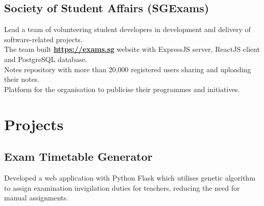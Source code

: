 \documentclass[a4paper,hidelinks]{resume} %
\begin{document}
\begin{minipage}[t]{0.50\textwidth}
    \sectionspace %
    
    
    \subsection{Society of Student Affairs (SGExams)}
    
    \textbullet{} Lead a team of volunteering student developers in development and delivery of software-related projects. \\
    \textbullet{} The team built \href{https://exams.sg}{\bf https://exams.sg} website with ExpressJS server, ReactJS client and PostgreSQL database. \\
    \textbullet{} Notes repository with more than 20,000 registered users sharing and uploading their notes. \\
    \textbullet{} Platform for the organisation to publicise their programmes and initiatives. \\
    
    
    \sectionspace %
    

    
    \section{Projects}
    
    \sectionspace %
    
    \subsection{Exam Timetable Generator}
    
    Developed a web application with Python Flask which utilises genetic algorithm to assign examination invigilation duties for teachers, reducing the need for manual assignments.
    
    \sectionspace %
    

\end{minipage}
\end{document}
